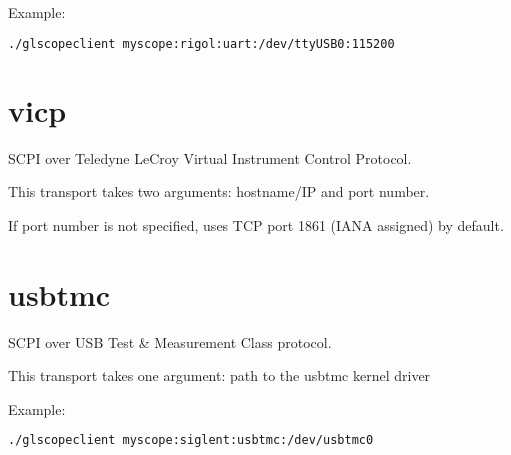 Example:
\begin{lstlisting}[language=sh]
./glscopeclient myscope:rigol:uart:/dev/ttyUSB0:115200
\end{lstlisting}

\section{vicp}

SCPI over Teledyne LeCroy Virtual Instrument Control Protocol.

This transport takes two arguments: hostname/IP and port number.

If port number is not specified, uses TCP port 1861 (IANA assigned) by default.

\section{usbtmc}

SCPI over USB Test \& Measurement Class protocol.

This transport takes one argument: path to the usbtmc kernel driver

Example:
\begin{lstlisting}[language=sh]
./glscopeclient myscope:siglent:usbtmc:/dev/usbtmc0
\end{lstlisting}


